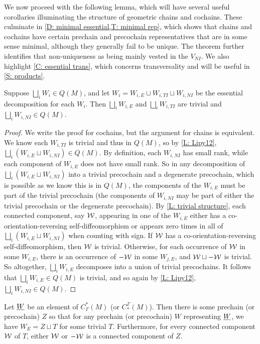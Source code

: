 We now proceed with the following lemma, which will have several useful corollaries illuminating the structure of geometric chains and cochains.
These culminate in \cref{D: minimal essential,T: minimal rep}, which shows that chains and cochains have certain prechain and precochain representatives that are in some sense minimal, although they generally fail to be unique.
The theorem further identifies that non-uniqueness as being mainly vested in the $V_{NI}$.
We also highlight \cref{C: essential trans}, which concerns transversality and will be useful in \cref{S: products}.

\begin{lemma}\label{L: Q essential}
	Suppose $\bigsqcup_i W_i \in Q(M)$, and let $W_i = W_{i,E} \sqcup W_{i,TI} \sqcup W_{i,NI}$ be the essential decomposition for each $W_i$.
	Then $\bigsqcup_i W_{i,E}$ and $\bigsqcup_i W_{i,TI}$ are trivial and $\bigsqcup_i W_{i,NI} \in Q(M)$.
\end{lemma}

\begin{proof}
	We write the proof for cochains, but the argument for chains is equivalent.
	We know each $W_{i,TI}$ is trivial and thus in $Q(M)$, so by \cref{L: Lipy12}, $\bigsqcup_i (W_{i,E} \sqcup W_{i,NI}) \in Q(M)$.
	By definition, each $W_{i,NI}$ has small rank, while each component of $W_{i,E}$ does not have small rank.
	So in any decomposition of $\bigsqcup_i (W_{i,E} \sqcup W_{i,NI})$ into a trivial precochain and a degenerate precochain, which is possible as we know this is in $Q(M)$, the components of the $W_{i,E}$ must be part of the trivial precochain (the components of $W_{i, NI}$ may be part of either the trivial precochain or the degenerate precochain).
	By \cref{L: trivial structure}, each connected component, say $\mathcal{W}$, appearing in one of the $W_{i,E}$ either has a co-orientation-reversing self-diffeomorphism or appears zero times in all of $\bigsqcup_i (W_{i,E} \sqcup W_{i,NI})$ when counting with sign.
	If $\mathcal{W}$ has a co-orientation-reversing self-diffeomorphism, then $\mathcal{W}$ is trivial.
	Otherwise, for each occurrence of $\mathcal{W}$ in some $W_{i,E}$, there is an occurrence of $-\mathcal{W}$ in some $W_{j,E}$, and $\mathcal{W} \sqcup -\mathcal{W}$ is trivial.
	So altogether, $\bigsqcup_i W_{i,E}$ decomposes into a union of trivial precochains.
	It follows that $\bigsqcup_i W_{i,E} \in Q(M)$ is trivial, and so again by \cref{L: Lipy12}, $\bigsqcup_i W_{i,NI} \in Q(M)$.
\end{proof}

\begin{corollary}\label{C: Q essential}
	Let $\underline{W}$ be an element of $C^*_\Gamma(M)$ (or $C_*^\Gamma(M)$).
	Then there is some prechain (or precochain) $Z$ so that for any prechain (or precochain) $W$ representing $\underline{W}$, we have $W_E = Z \sqcup T$ for some trivial $T$.
	Furthermore, for every connected component $\mathcal{W}$ of $T$, either $\mathcal{W}$ or $-\mathcal{W}$ is a connected component of $Z$.
\end{corollary}

